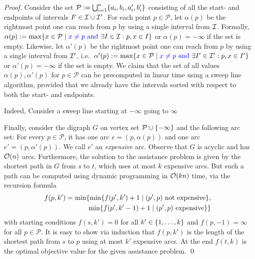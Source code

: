 \begin{proof}
Consider the set $\mathcal{P} := \bigcup_{i=1}^n \{ a_i, b_i, a'_i, b'_i \}$ consisting of all the start- and endpoints of intervals $F \in \mathcal{I} \cup \mathcal{I}'$. For each point $p \in \mathcal{P}$, let $\alpha(p)$ be the rightmost point one can reach from $p$ by using a single interval from $\mathcal{I}$. Formally, $\alpha(p) := \max\{ x \in \mathcal{P} \mid \textcolor{blue}{x \neq p \text{ and }} \exists I \in \mathcal{I}: p, x \in I \}$ or $\alpha(p) = -\infty$ if the set is empty. Likewise, let $\alpha'(p)$ be the rightmost point one can reach from $p$ by using a single interval from $\mathcal{I}'$, i.e.\ $\alpha'(p) := \max\{ x \in \mathcal{P} \mid \textcolor{blue}{x \neq p \text{ and }} \exists I' \in \mathcal{I}': p, x \in I' \}$ or $\alpha'(p) = -\infty$ if the set is empty. We claim that the set of all values $\alpha(p), \alpha'(p)$ for $p \in \mathcal{P}$ can be precomputed in linear time using a sweep line algorithm, provided that we already have the intervals sorted with respect to both the start- and endpoints. 

Indeed,  Consider a sweep line starting at $-\infty$ going to $\infty$ 

Finally, consider the digraph $G$ on vertex set $\mathcal{P} \cup \{ -\infty \}$ and the following arc set: For every $p \in \mathcal{P}$, it has one arc $e = (p, \alpha(p))$ and one arc $e' = (p, \alpha'(p))$. We call $e'$ an \emph{expensive} arc. Observe that $G$ is acyclic and has $\mathcal{O}(n)$ arcs. Furthermore, the solution to the assistance problem is given by the shortest path in $G$ from $s$ to $t$, which uses at most $k$ expensive arcs. But such a path can be computed using dynamic programming in $\mathcal{O}(kn)$ time, via the recursion formula
\begin{align*}
f(p, k') = \min\{ \min\{ f(p',k')+1 \mid (p',p) \text{ not expensive} \},\\ \min\{ f(p',k'-1)+1 \mid (p',p) \text{ expensive} \} \} 
\end{align*}
with starting conditions $f(s, k') = 0$ for all $k' \in \{ 1, \ldots, k \}$ and $f(p, -1) = \infty$ for all $p \in \mathcal{P}$.
It is easy to show via induction that $f(p,k')$ is the length of the shortest path from $s$ to $p$
using at most $k'$ expensive arcs. At the end $f(t,k)$ is the optimal objective value for the given assistance problem.
\qed\end{proof}


